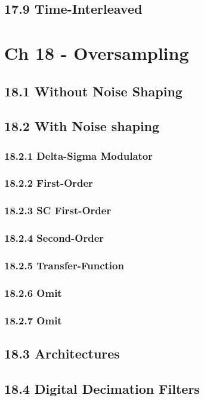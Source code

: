 \documentclass[a4paper,twocolumn]{article}
\begin{document}
    \subsection{17.9 Time-Interleaved}
  \section{Ch 18 - Oversampling}
    \subsection{18.1 Without Noise Shaping}
    \subsection{18.2 With Noise shaping}
      \subsubsection{18.2.1 Delta-Sigma Modulator}
      \subsubsection{18.2.2 First-Order}
      \subsubsection{18.2.3 SC First-Order}
      \subsubsection{18.2.4 Second-Order}
      \subsubsection{18.2.5 Transfer-Function}
      \subsubsection{18.2.6 Omit}
      \subsubsection{18.2.7 Omit}
    \subsection{18.3 Architectures}
    \subsection{18.4 Digital Decimation Filters}
\end{document}

